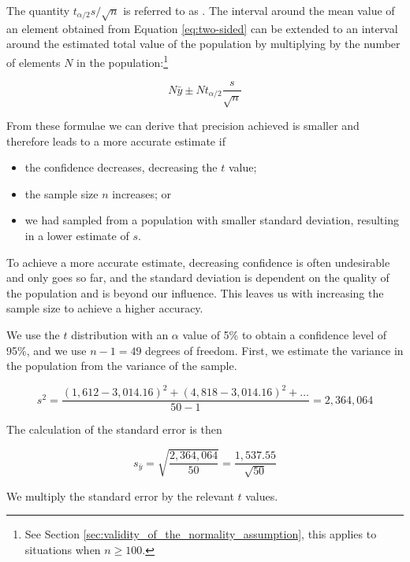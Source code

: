 The quantity $t_{\alpha/2} {s}/{\sqrt{n}}$ is referred to as . The interval around the mean value of an element obtained from Equation \ref{eq:two-sided} can be extended to an interval around the estimated total value of the population by multiplying by the number of elements $N$ in the population:\footnote{See Section \ref{sec:validity_of_the_normality_assumption}, this applies to situations when $n \geq 100$.
}

\begin{equation}
N \bar{y} \pm N t_{\alpha/2} \frac{s}{\sqrt{n}}
\label{eq:two-sided_pop}
\end{equation}

From these formulae we can derive that precision achieved is smaller and therefore leads to a more accurate estimate if

\begin{itemize}
\item the confidence decreases, decreasing the $t$ value;
\item the sample size $n$ increases; or
\item we had sampled from a population with smaller standard deviation, resulting in a lower estimate of $s$.
\end{itemize}

To achieve a more accurate estimate, decreasing confidence is often undesirable and only goes so far, and the standard deviation is dependent on the quality of the population and is beyond our influence. This leaves us with increasing the sample size to achieve a higher accuracy.

\bigskip
We use the $t$ distribution with an $\alpha$ value of 5\% to obtain a confidence level of 95\%, and we use $n - 1 = 49$ degrees of freedom. 
First, we estimate the variance in the population from the variance of the sample.

\begin{equation*}
s^2 = \frac{ (1,612 - 3,014.16)^2 + (4,818 - 3,014.16)^2 + \ldots}{50-1} = 2,364,064
\end{equation*} 

The calculation of the standard error is then

\begin{equation}
s_{\bar{y}} = \sqrt{\frac{2,364,064}{50}} = \frac{1,537.55}{\sqrt{50}}
\end{equation} 

We multiply the standard error by the relevant $t$ values. 

